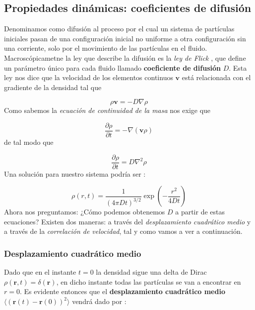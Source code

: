 \documentclass[11pt]{article} %
\newcommand{\parentesis}[1]{\left( #1  \right)}
\newcommand{\parciales}[2]{\frac{\partial #1}{\partial #2}}
\newcommand{\rn}{\mathbf{r}}
\newcommand{\vn}{\mathbf{v}}
\begin{document}
\subsection{Propiedades dinámicas: coeficientes de difusión}

Denominamos como difusión al proceso por el cual un sistema de partículas iniciales pasan de una configuración inicial no uniforme a otra configuración sin una corriente, solo por el movimiento de las partículas en el fluido. Macroscópicametne la ley que describe la difusión es la \textit{ley de Flick} \cite{Frenkel}, que define un parámetro único para cada fluido llamado \textbf{coeficiente de difusión} $D$. Esta ley nos dice que la velocidad de los elementos continuos $\vn$ está relacionada con el gradiente de la densidad tal que \cite{Rapaport}

\begin{equation}
	\rho \vn  = - D \nabla \rho
\end{equation}
Como sabemos la \textit{ecuación de continuidad de la masa} nos exige que

\begin{equation}
	\parciales{\rho}{t} = - \nabla (\vn \rho)
\end{equation}
de tal modo que 

\begin{equation}
	\parciales{\rho}{t} = D \nabla^2 \rho
\end{equation}
Una solución para nuestro sistema podría ser \cite{Frenkel}: 

\begin{equation}
	\rho (r,t) = \frac{1}{(4\pi Dt)^{3/2}} \exp \parentesis{- \frac{r^2}{4Dt}}
\end{equation}
Ahora nos preguntamos: ¿Cómo podemos obtenemos $D$ a partir de estas ecuaciones? Existen dos maneras: a través del \textit{desplazamiento cuadrático medio} y a través de la \textit{correlación de velocidad}, tal y como vamos a ver a continuación. 

\subsubsection{Desplazamiento cuadrático medio}

Dado que en el instante $t=0$ la densidad sigue una delta de Dirac $\rho(\rn,t)=\delta(\rn)$, en dicho instante todas las partículas se van a encontrar en $r=0$. Es evidente entonces que el  \textbf{desplazamiento cuadrático medio} $\langle (\rn(t)-\rn(0))^2 \rangle$ vendrá dado por \cite{Haile}:
\end{document}
